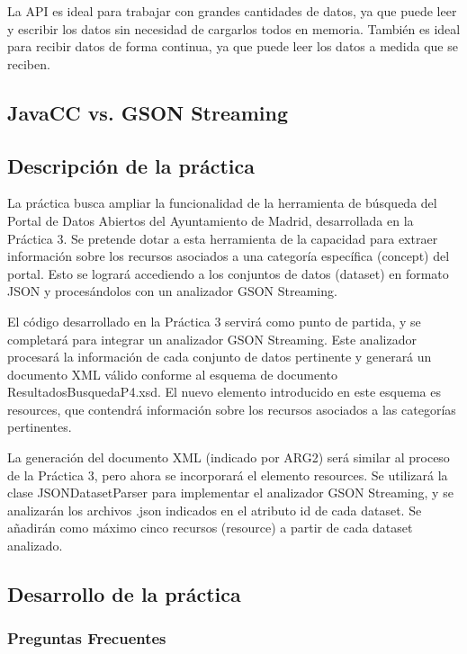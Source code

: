 La API es ideal para trabajar con grandes cantidades de datos, ya que puede leer y escribir los datos sin necesidad de cargarlos todos en memoria. También es ideal para recibir datos de forma continua, ya que puede leer los datos a medida que se reciben.


\subsection{JavaCC vs. GSON Streaming}

\subsection{Descripción de la práctica}

\noindent La práctica busca ampliar la funcionalidad de la herramienta de búsqueda del Portal de Datos Abiertos del Ayuntamiento de Madrid, desarrollada en la Práctica 3. Se pretende dotar a esta herramienta de la capacidad para extraer información sobre los recursos asociados a una categoría específica (concept) del portal. Esto se logrará accediendo a los conjuntos de datos (dataset) en formato JSON y procesándolos con un analizador GSON Streaming.

El código desarrollado en la Práctica 3 servirá como punto de partida, y se completará para integrar un analizador GSON Streaming. Este analizador procesará la información de cada conjunto de datos pertinente y generará un documento XML válido conforme al esquema de documento ResultadosBusquedaP4.xsd. El nuevo elemento introducido en este esquema es resources, que contendrá información sobre los recursos asociados a las categorías pertinentes.

La generación del documento XML (indicado por ARG2) será similar al proceso de la Práctica 3, pero ahora se incorporará el elemento resources. Se utilizará la clase JSONDatasetParser para implementar el analizador GSON Streaming, y se analizarán los archivos .json indicados en el atributo id de cada dataset. Se añadirán como máximo cinco recursos (resource) a partir de cada dataset analizado.

\subsection{Desarrollo de la práctica}


\subsubsection{Preguntas Frecuentes}


